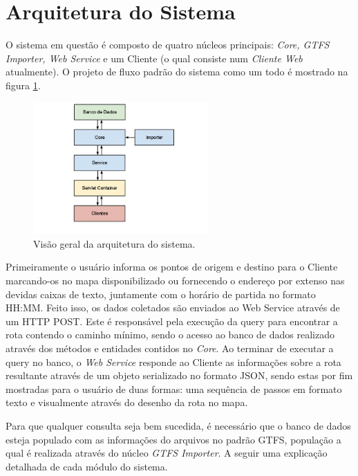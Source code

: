 \section{Arquitetura do Sistema}
O sistema em questão é composto de quatro núcleos principais: \emph{Core, GTFS Importer, Web Service} e um Cliente (o qual consiste num \emph{Cliente Web} atualmente). 
O projeto de fluxo padrão do sistema como um todo é mostrado na figura \ref{fig:arquitetura}.

\begin{figure}[!htb]
	\centering
	\includegraphics[width=0.6\textwidth]{./arquitetura.jpg}
	\caption[ImgArquitetura]{Visão geral da arquitetura do sistema.}
	\label{fig:arquitetura}
\end{figure}

Primeiramente o usuário informa os pontos de origem e destino para o Cliente marcando-os no mapa disponibilizado ou fornecendo o endereço por extenso nas devidas caixas de texto, juntamente com o horário de partida no formato HH:MM. 
Feito isso, os dados coletados são enviados ao Web Service através de um HTTP POST. 
Este é responsável pela execução da query para encontrar a rota contendo o caminho mínimo, sendo o acesso ao banco de dados realizado através dos métodos e entidades contidos no \emph{Core}.
Ao terminar de executar a query no banco, o \emph{Web Service} responde ao Cliente as informações sobre a rota resultante através de um objeto serializado no formato JSON, sendo estas por fim mostradas para o usuário de duas formas: uma sequência de passos em formato texto e visualmente através do desenho da rota no mapa.

Para que qualquer consulta seja bem sucedida, é necessário que o banco de dados esteja populado com as informações do arquivos no padrão GTFS, população a qual é realizada através do núcleo \emph{GTFS Importer}.
A seguir uma explicação detalhada de cada módulo do sistema.

